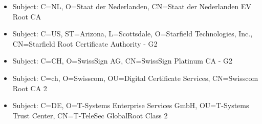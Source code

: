 \documentclass[xcolor={dvipsnames,svgnames},hyperref=dvips]{beamer}
\begin{document}
	\begin{frame}
		\begin{itemize}
		\item Subject: C=NL, O=Staat der Nederlanden, CN=Staat der Nederlanden EV Root CA
		\item Subject: C=US, ST=Arizona, L=Scottsdale, O=Starfield Technologies, Inc., CN=Starfield Root Certificate Authority - G2
		\item Subject: C=CH, O=SwissSign AG, CN=SwissSign Platinum CA - G2
		\item Subject: C=ch, O=Swisscom, OU=Digital Certificate Services, CN=Swisscom Root CA 2
		\item Subject: C=DE, O=T-Systems Enterprise Services GmbH, OU=T-Systems Trust Center, CN=T-TeleSec GlobalRoot Class 2
		\end{itemize}
	\end{frame}
\end{document}
